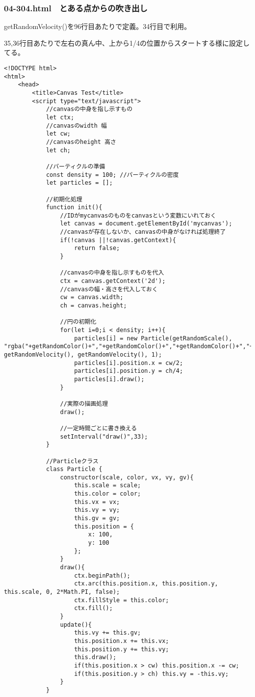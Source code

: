 \documentclass[mingoth,11pt,a4j,uplatex]{jsarticle}
\begin{document}
\subsubsection{04-304.html　とある点からの吹き出し}
getRandomVelocity()を96行目あたりで定義。34行目で利用。

35,36行目あたりで左右の真ん中、上から1/4の位置からスタートする様に設定してる。

\begin{lstlisting}[caption=とある点からの吹き出し]
<!DOCTYPE html>
<html>
	<head>
		<title>Canvas Test</title>
		<script type="text/javascript">
			//canvasの中身を指し示すもの
			let ctx;
			//canvasのwidth 幅
			let cw;
			//canvasのheight 高さ
			let ch;
			
			//パーティクルの準備
			const density = 100; //パーティクルの密度
			let particles = [];
			
			//初期化処理
			function init(){
				//IDがmycanvasのものをcanvasという変数にいれておく
				let canvas = document.getElementById('mycanvas');
				//canvasが存在しないか、canvasの中身がなければ処理終了
				if(!canvas ||!canvas.getContext){
					return false;
				}
				
				//canvasの中身を指し示すものを代入
				ctx = canvas.getContext('2d');
				//canvasの幅・高さを代入しておく
				cw = canvas.width;
				ch = canvas.height;
				
				//円の初期化
				for(let i=0;i < density; i++){
					particles[i] = new Particle(getRandomScale(), "rgba("+getRandomColor()+","+getRandomColor()+","+getRandomColor()+","+getRandomAlpha()+")", getRandomVelocity(), getRandomVelocity(), 1);
					particles[i].position.x = cw/2;
					particles[i].position.y = ch/4;
					particles[i].draw();			
				}
				
				//実際の描画処理
				draw();
				
				//一定時間ごとに書き換える
				setInterval("draw()",33);
			}
			
			//Particleクラス
			class Particle {
				constructor(scale, color, vx, vy, gv){
					this.scale = scale;
					this.color = color;
					this.vx = vx;
					this.vy = vy;
					this.gv = gv;
					this.position = {
						x: 100,
						y: 100
					};
				}
				draw(){
					ctx.beginPath();
					ctx.arc(this.position.x, this.position.y, this.scale, 0, 2*Math.PI, false);
					ctx.fillStyle = this.color;
					ctx.fill();
				}
				update(){
					this.vy += this.gv;
					this.position.x += this.vx;
					this.position.y += this.vy;
					this.draw();
					if(this.position.x > cw) this.position.x -= cw;
					if(this.position.y > ch) this.vy = -this.vy;
				}
			}
			

\end{lstlisting}
\end{document}
